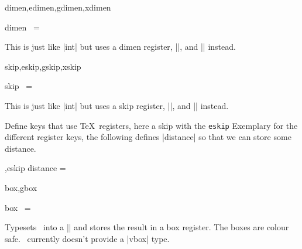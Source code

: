 \begin{function}[module=expkv-def type]{dimen,edimen,gdimen,xdimen}
  \begin{syntax}
    dimen \key\ =  
  \end{syntax}
  This is just like |int| but uses a dimen register, |\newdimen|, and |\dimexpr|
  instead.
\end{function}

\begin{function}[module=expkv-def type]{skip,eskip,gskip,xskip}
  \begin{syntax}
    skip \key\ =  
  \end{syntax}
  This is just like |int| but uses a skip register, |\newskip|, and |\glueexpr|
  instead.
\end{function}
\begin{example}
    {Define keys that use \TeX\ registers, here a skip with the \texttt{eskip}
    \type}
  Exemplary for the different register keys, the following defines |distance| so
  that we can store some distance.
  \begin{enverb}
        ,eskip distance = \exampledistance
  \end{enverb}
\end{example}


\begin{function}[module=expkv-def type]{box,gbox}
  \begin{syntax}
    box \key\ =  
  \end{syntax}
  Typesets \val\ into a |\hbox| and stores the result in a box register. The
  boxes are colour safe. \expkvd\ currently doesn't provide a |vbox| type.
\end{function}

